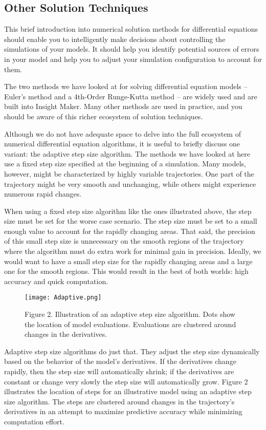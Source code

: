 \documentclass[]{memoir}
\let\Oldincludegraphics\includegraphics
\renewcommand{\includegraphics}[1]{\Oldincludegraphics[max size={\textwidth}{\textheight}]{#1}}
\begin{document}
\subsection{Other Solution Techniques}

This brief introduction into numerical solution methods for differential
equations should enable you to intelligently make decisions about
controlling the simulations of your models. It should help you identify
potential sources of errors in your model and help you to adjust your
simulation configuration to account for them.

The two methods we have looked at for solving differential equation
models -- Euler's method and a 4th-Order Runge-Kutta method -- are
widely used and are built into Insight Maker. Many other methods are
used in practice, and you should be aware of this richer ecosystem of
solution techniques.

Although we do not have adequate space to delve into the full ecosystem
of numerical differential equation algorithms, it is useful to briefly
discuss one variant: the adaptive step size algorithm. The methods we
have looked at here use a fixed step size specified at the beginning of
a simulation. Many models, however, might be characterized by highly
variable trajectories. One part of the trajectory might be very smooth
and unchanging, while others might experience numerous rapid changes.

When using a fixed step size algorithm like the ones illustrated above,
the step size must be set for the worse case scenario. The step size
must be set to a small enough value to account for the rapidly changing
areas. That said, the precision of this small step size is unnecessary
on the smooth regions of the trajectory where the algorithm must do
extra work for minimal gain in precision. Ideally, we would want to have
a small step size for the rapidly changing areas and a large one for the
smooth regions. This would result in the best of both worlds: high
accuracy and quick computation.

\begin{figure}[htbp]
\centering
\texttt{[image: Adaptive.png]}
\caption{Figure 2. Illustration of an adaptive step size algorithm. Dots
show the location of model evaluations. Evaluations are clustered around
changes in the derivatives.}
\end{figure}

Adaptive step size algorithms do just that. They adjust the step size
dynamically based on the behavior of the model's derivatives. If the
derivatives change rapidly, then the step size will automatically
shrink; if the derivatives are constant or change very slowly the step
size will automatically grow. Figure 2 illustrates the location of steps
for an illustrative model using an adaptive step size algorithm. The
steps are clustered around changes in the trajectory's derivatives in an
attempt to maximize predictive accuracy while minimizing computation
effort.
\end{document}
